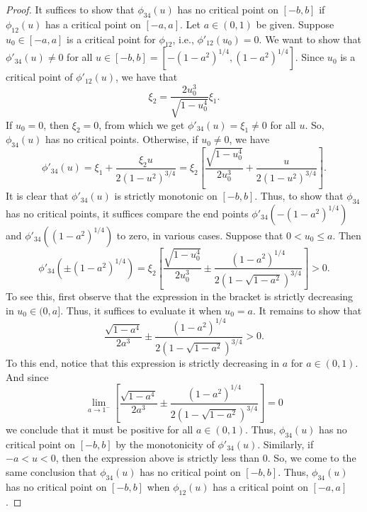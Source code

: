 \documentclass[11pt]{article}
\newcommand{\lb}{\left[}
\newcommand{\rb}{\right]}
\newcommand{\f}[2]{\frac{#1}{#2}}
\begin{document}
\begin{proof}
It suffices to show that $\phi_{34}(u)$ has no critical point on $[-b,b]$ if $\phi_{12}(u)$ has a critical point on $[-a,a]$. Let $a \in (0,1)$ be given. Suppose $u_0 \in [-a,a]$ is a critical point for $\phi_{12}$, i.e., $\phi'_{12}(u_0) = 0$. We want to show that $\phi'_{34}(u) \neq 0$ for all $u\in [-b,b] = [-(1-a^2)^{1/4}, (1-a^2)^{1/4}]$. Since $u_0$ is a critical point of $\phi'_{12}(u)$, we have that
\begin{equation*}
    \xi_2 = \f{2u_0^3 }{\sqrt{1-u_0^4}}  \xi_1.
\end{equation*}
If $u_0 = 0$, then $\xi_2 = 0$, from which we get $\phi'_{34}(u) = \xi_1 \neq 0$ for all $u$. So, $\phi_{34}(u)$ has no critical points. Otherwise, if $u_0 \neq 0$, we have 
\begin{equation*}
    \phi'_{34}(u) =  \xi_1  + \f{\xi_2 u}{2(1-u^2)^{3/4}}  = \xi_2 \lb \f{\sqrt{1-u^4_0}}{2 u_0^3}  + \f{ u}{2(1-u^2)^{3/4}}\rb.
\end{equation*}
It is clear that $\phi'_{34}(u)$ is strictly monotonic on $[-b,b]$. Thus, to show that $\phi_{34}$ has no critical points, it suffices compare the end points $\phi'_{34}(-(1-a^2)^{1/4})$ and $\phi'_{34}((1-a^2)^{1/4})$ to zero, in various cases. Suppose that $0 < u_0 \leq a$. Then 
\begin{equation*}
    \phi'_{34}(\pm (1-a^2)^{1/4}) = \xi_2 \lb \f{\sqrt{1-u^4_0}}{2 u_0^3}  \pm \f{ (1-a^2)^{1/4}}{2(1-\sqrt{1-a^2})^{3/4}}\rb  > 0.
\end{equation*}
To see this, first observe that the expression in the bracket is strictly decreasing in $u_0 \in (0,a]$. Thus, it suffices to evaluate it when $u_0 = a$. It remains to show that 
\begin{equation*}
    \f{\sqrt{1-a^4}}{2 a^3}  \pm \f{ (1-a^2)^{1/4}}{2(1-\sqrt{1-a^2})^{3/4}}  > 0.
\end{equation*}
To this end, notice that this expression is strictly decreasing in $a$ for $a\in (0,1)$. And since 
\begin{equation*}
    \lim_{a\to 1^-} \lb \f{\sqrt{1-a^4}}{2 a^3}  \pm \f{ (1-a^2)^{1/4}}{2(1-\sqrt{1-a^2})^{3/4}} \rb = 0
\end{equation*}
we conclude that it must be positive for all $a\in (0,1)$. Thus, $\phi_{34}(u)$ has no critical point on $[-b,b]$ by the monotonicity of $\phi'_{34}(u)$. Similarly, if $-a < u < 0$, then the expression above is strictly less than 0. So, we come to the same conclusion that $\phi_{34}(u)$ has no critical point on $[-b,b]$. Thus, $\phi_{34}(u)$ has no critical point on $[-b,b]$ when $\phi_{12}(u)$ has a critical point on $[-a,a]$. 
\end{proof}
\end{document}
